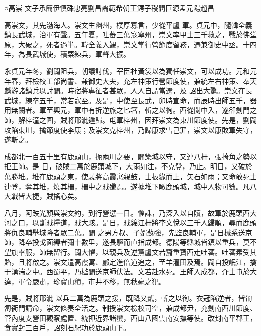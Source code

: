 
\begin{pinyinscope}

 ○高崇
 文子承簡伊慎硃忠亮劉昌裔範希朝王鍔子稷閻巨源孟元陽趙昌



 高崇文，其先渤海人。崇文生幽州，樸厚寡言，少從平盧
 軍。貞元中，隨韓全義鎮長武城，治軍有聲。五年夏，吐蕃三萬寇寧州，崇文率甲士三千救之，戰於佛堂原，大破之，死者過半。韓全義入覲，崇文掌行營節度留務，遷兼御史中丞。十四年，為長武城使，積粟練兵，軍聲大振。



 永貞元年冬，劉闢阻兵，朝議討伐，宰臣杜黃裳以為獨任崇文，可以成功。元和元年春，拜檢校工部尚書、兼御史大夫，充左神策行營節度使，兼統左右神策、奉天麟游諸鎮兵以討闢。時宿將專征者甚眾，人人自謂當選，及
 詔出大驚。崇文在長武城，練卒五千，常若寇至。及是，中使至長武，卯時宣命，而辰時出師五千，器用無闕者。軍至興元，軍中有折逆旅之匕箸，斬之以徇。西從閬中入，遂卻劍門之師，解梓潼之圍，賊將邢泚遁歸。屯軍梓州，因拜崇文為東川節度使。先是，劉闢攻陷東川，擒節度使李康；及崇文克梓州，乃歸康求雪己罪，崇文以康敗軍失守，遂斬之。



 成都北一百五十里有鹿頭山，扼兩川之要，闢築城以守，又連八柵，張掎角之勢以拒王師。是
 日，破賊二萬於鹿頭城下，大雨如注，不克登，乃止。明日，又破於萬勝堆。堆在鹿頭之東，使驍將高霞寓親鼓，士扳緣而上，矢石如雨；又命敢死士連登，奪其堆，燒其柵，柵中之賊殲焉。遂據堆下瞰鹿頭城，城中人物可數。凡八大戰皆大捷，賊搖心矣。



 八月，阿跌光顏與崇文約，到行營愆一日。懼誅，乃深入以自贖，故軍於鹿頭西大河之口，以斷賊糧道，賊大駭。是日，賊綿江柵將李文悅以三千人歸順，尋而鹿頭將仇良輔舉城降者眾二萬。闢
 之男方叔、子婿蘇強，先監良輔軍，是日械系送京師，降卒投戈面縛者彌十數里，遂長驅而直指成都。德陽等縣城皆鎮以重兵，莫不望旗率服，師無留行。闢大懼，以親兵及逆黨盧文若齎重寶西走吐蕃。吐蕃素受其賂，且將啟之。崇文遣高霞寓、酈定進倍道追之，至羊灌田及焉。闢自投岷江，擒于湧湍之中。西蜀平，乃檻闢送京師伏法。文若赴水死。王師入成都，介士屯於大逵，軍令嚴肅，珍寶山積，市井不移，無秋毫之犯。



 先是，賊將邢泚
 以兵二萬為鹿頭之援，既降又貳，斬之以徇。衣冠陷逆者，皆匍匐衙門請命，崇文條奏全活之。制授崇文檢校司空，兼成都尹，充劍南西川節度、管內度支營田觀察處置、統押近界諸蠻，西山八國雲南安撫等使。改封南平郡王，食實封三百戶，詔刻石紀功於鹿頭山下。




\end{pinyinscope}
